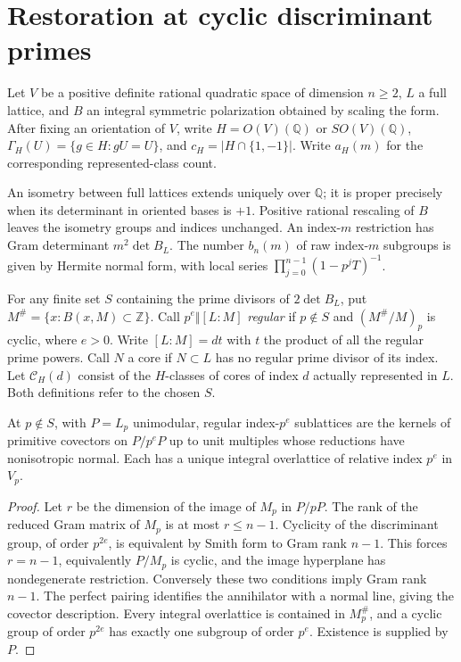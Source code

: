 \section{Restoration at cyclic discriminant primes}\label{sec:core}
Let $V$ be a positive definite rational quadratic space of dimension
$n\ge2$, $L$ a full lattice, and $B$ an integral symmetric polarization obtained by scaling
the form. After fixing an orientation of $V$, write
$H=O(V)(\mathbb Q)$ or $SO(V)(\mathbb Q)$,
$\Gamma_H(U)=\{g\in H:gU=U\}$, and $c_H=|H\cap\{1,-1\}|$.
Write $a_H(m)$ for the corresponding represented-class count.

An isometry between full lattices extends uniquely over $\mathbb Q$;
it is proper precisely when its determinant in oriented bases is $+1$.
Positive rational rescaling of $B$ leaves the isometry groups and
indices unchanged. An index-$m$ restriction has Gram determinant
$m^2\det B_L$. The number $b_n(m)$ of raw index-$m$ subgroups
is given by Hermite normal form, with local series
$\prod_{j=0}^{n-1}(1-p^jT)^{-1}$.

For any finite set $S$ containing the prime divisors of $2\det B_L$, put $M^\#=\{x:B(x,M)\subset\mathbb Z\}$. Call $p^e\Vert [L:M]$ \emph{regular} if $p\notin S$ and $(M^\#/M)_p$ is cyclic, where $e>0$. Write $[L:M]=dt$ with $t$ the product of all the regular prime powers. Call $N$ a core if $N\subset L$ has no regular prime divisor of its index. Let $\mathcal C_H(d)$ consist of the $H$-classes of cores of index $d$ actually represented in $L$. Both definitions refer to the chosen $S$.

\begin{lemma}\label{lem:local}
At $p\notin S$, with $P=L_p$ unimodular, regular index-$p^e$ sublattices are the kernels of primitive covectors on $P/p^eP$ up to unit multiples whose reductions have nonisotropic normal. Each has a unique integral overlattice of relative index $p^e$ in $V_p$.
\end{lemma}
\begin{proof}
Let $r$ be the dimension of the image of $M_p$ in $P/pP$. The rank of the reduced Gram matrix of $M_p$ is at most $r\le n-1$. Cyclicity of the discriminant group, of order $p^{2e}$, is equivalent by Smith form to Gram rank $n-1$. This forces $r=n-1$, equivalently $P/M_p$ is cyclic, and the image hyperplane has nondegenerate restriction. Conversely these two conditions imply Gram rank $n-1$. The perfect pairing identifies the annihilator with a normal line, giving the covector description. Every integral overlattice is contained in $M_p^\#$, and a cyclic group of order $p^{2e}$ has exactly one subgroup of order $p^e$. Existence is supplied by $P$.
\end{proof}

